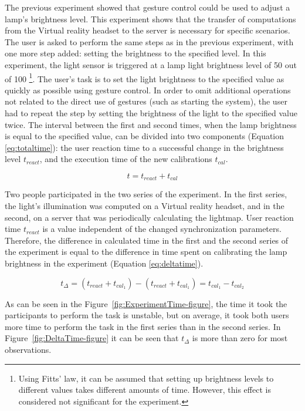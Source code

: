 The previous experiment showed that gesture control could be used to adjust a lamp's brightness level. This experiment shows that the transfer of computations from the Virtual reality headset to the server is necessary for specific scenarios. The user is asked to perform the same steps as in the previous experiment, with one more step added:  setting the brightness to the specified level. In this experiment, the light sensor is triggered at a lamp light brightness level of 50 out of 100 \footnote{Using Fitts' law, it can be assumed that setting up brightness levels to different values takes different amounts of time. However, this effect is considered not significant for the experiment.}. The user's task is to set the light brightness to the specified value as quickly as possible using gesture control. In order to omit additional operations not related to the direct use of gestures (such as starting the system), the user had to repeat the step by setting the brightness of the light to the specified value twice. The interval between the first and second times, when the lamp brightness is equal to the specified value, can be divided into two components (Equation \eqref{eq:totaltime}): the user reaction time to a successful change in the brightness level $ t_{react} $, and the execution time of the new calibrations $ t_{cal} $.


\begin{equation}
  t = t_{react} + t_{cal}
  \label{eq:totaltime}
\end{equation}

Two people participated in the two series of the experiment. In the first series, the light's illumination was computed on a Virtual reality headset, and in the second, on a server that was periodically calculating the lightmap. User reaction time $ t_{react} $ is a value independent of the changed synchronization parameters. Therefore, the difference in calculated time in the first and the second series of the experiment is equal to the difference in time spent on calibrating the lamp brightness in the experiment (Equation \eqref{eq:deltatime}).

\begin{equation}
  t _{\Delta} = (t_{react} + t_{cal_1}) - (t_{react} + t_{cal_1}) = t_{cal_1} - t_{cal_2}
  \label{eq:deltatime}
\end{equation}

As can be seen in the Figure~\ref{fig:ExperimentTime-figure}, the time it took the participants to perform the task is unstable, but on average, it took both users more time to perform the task in the first series than in the second series. In Figure~\ref{fig:DeltaTime-figure} it can be seen that $t_{\Delta}$ is more than zero for most observations.

